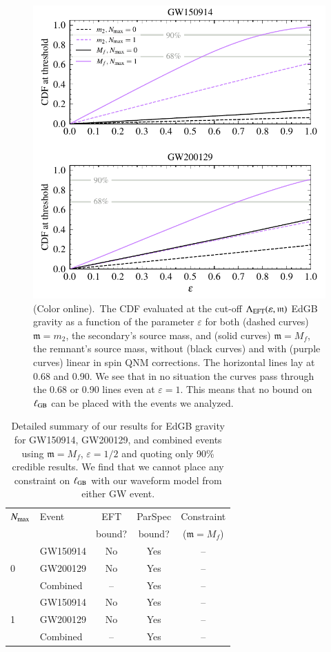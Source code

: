 \documentclass[twocolumn,
               prd,
               aps,
               superscriptaddress,
               tightenlines,
               nofootinbib,
               eqsecnum,
               amsfonts,
               amsmath,
               longbibliography]{revtex4-1}
\newcommand{\gm}{\mathfrak{m}}
\begin{document}
\begin{figure}[t]
\includegraphics[width=\columnwidth]{figs/edgb_cdf_varying_threshold.pdf}
\caption{(Color online).~The CDF evaluated at the
cut-off $\Lambda_{\rm EFT}(\varepsilon,\gm)$ EdGB gravity as a function of the parameter
$\varepsilon$ for both (dashed curves) $\gm = m_2$, the secondary's source
mass, and (solid curves) $\gm = M_{f}$, the remnant's source mass, without
(black curves) and with (purple curves) linear in spin QNM corrections. The
horizontal lines lay at 0.68 and 0.90. We see that in no situation the curves pass
through the 0.68 or 0.90 lines even at $\varepsilon = 1$.
%
This means that no bound on $\ell_{\rm GB}$ can be placed with the events we
analyzed.
}
\label{fig:edgb_cdf}
\end{figure}

\begin{table}[h]
\begin{tabular}{l l c c c}
\hline
\hline
$N_{\rm max}$ & Event &  EFT    & ParSpec & Constraint      \\
              &       &  bound? & bound?  & ($\gm = M_{f}$) \\
\hline
  & GW150914 & No  & Yes & -- \\
0 & GW200129 & No  & Yes & -- \\
  & Combined & --  & Yes & -- \\
\hline
  & GW150914 & No  & Yes & -- \\
1 & GW200129 & No  & Yes & -- \\
  & Combined & --  & Yes & -- \\
\hline
\hline
\end{tabular}
\caption{Detailed summary of our results for EdGB gravity for GW150914, GW200129, and
combined events using $\gm = M_{f}$, $\varepsilon = 1/2$ and quoting only 90\% credible results.
%
We find that we cannot place any constraint on $\ell_{\rm GB}$ with our waveform model from either GW event.
}
\label{tab:summary_edgb}
\end{table}
\end{document}
